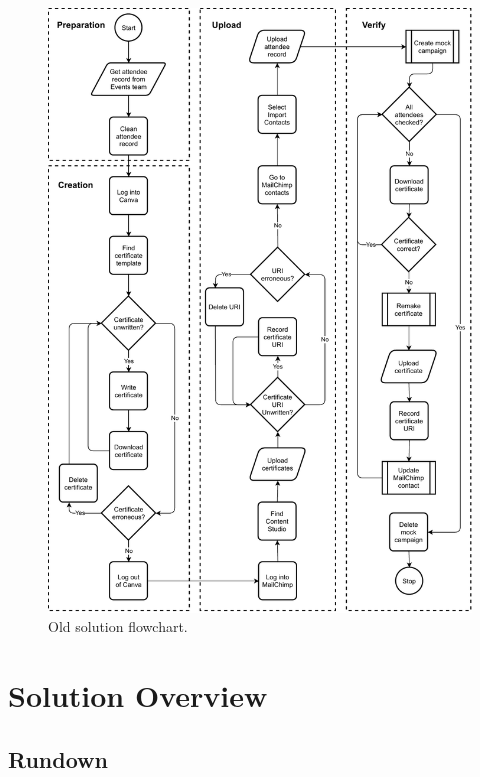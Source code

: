 \documentclass[11pt]{article}
\begin{document}
\begin{figure}[h!]
    \includegraphics[width=\textwidth]{figures/old_solution.pdf}
    \caption{Old solution flowchart.}
    \label{fig:old-solution}
\end{figure}

\newpage

\section{Solution Overview}

\subsection{Rundown}
\end{document}
